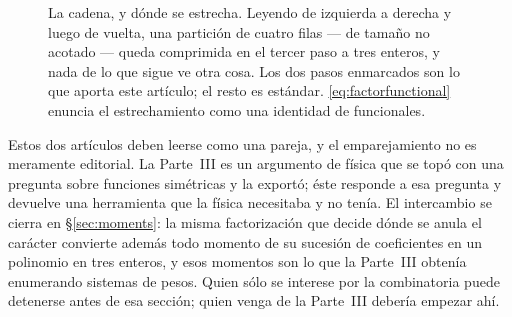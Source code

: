 \documentclass[11pt,a4paper]{article}
\begin{document}
\begin{figure}[h]
\centering
{}
\caption{La cadena, y d\'onde se estrecha. Leyendo de izquierda a derecha y luego de vuelta, una
partici\'on de cuatro filas --- de tama\~no no acotado --- queda comprimida en el tercer paso a
tres enteros, y nada de lo que sigue ve otra cosa. Los dos pasos enmarcados son lo que aporta
este art\'iculo; el resto es est\'andar. \eqref{eq:factorfunctional} enuncia el estrechamiento
como una identidad de funcionales.}
\label{fig:chain}
\end{figure}

Estos dos art\'iculos deben leerse como una pareja, y el emparejamiento no es meramente
editorial. La Parte~III es un argumento de f\'isica que se top\'o con una pregunta sobre
funciones sim\'etricas y la export\'o; \'este responde a esa pregunta y devuelve una
herramienta que la f\'isica necesitaba y no ten\'ia. El intercambio se cierra en
\S\ref{sec:moments}: la misma factorizaci\'on que decide d\'onde se anula el car\'acter
convierte adem\'as todo momento de su sucesi\'on de coeficientes en un polinomio en tres
enteros, y esos momentos son lo que la Parte~III obten\'ia enumerando sistemas de pesos. Quien
s\'olo se interese por la combinatoria puede detenerse antes de esa secci\'on; quien venga de
la Parte~III deber\'ia empezar ah\'i.
\end{document}
